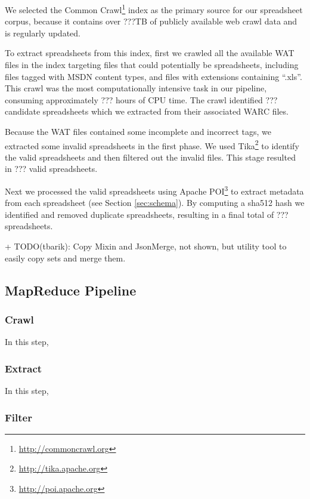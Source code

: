 \documentclass[conference]{IEEEtran}
\begin{document}
We selected the Common Crawl\footnote{\url{http://commoncrawl.org}} index as the primary source for our spreadsheet corpus, because it contains over ???TB of publicly available web crawl data and is regularly updated.

To extract spreadsheets from this index, first we crawled all the available WAT files in the index targeting files that could potentially be spreadsheets, including files tagged with MSDN content types, and files with extensions containing ``.xls''. 
This crawl was the most computationally intensive task in our pipeline, consuming approximately ??? hours of CPU time. 
The crawl identified ??? candidate spreadsheets which we extracted from their associated WARC files. 

Because the WAT files contained some incomplete and incorrect tags, we extracted some invalid spreadsheets in the first phase. We used Tika\footnote{\url{http://tika.apache.org}} to identify the valid spreadsheets and then filtered out the invalid files. This stage resulted in ??? valid spreadsheets.
 
Next we processed the valid spreadsheets using Apache POI\footnote{\url{http://poi.apache.org}} to extract metadata from each spreadsheet (see Section \ref{sec:schema}). By computing a sha512 hash we identified and removed duplicate spreadsheets, resulting in a final total of ??? spreadsheets. 

+ TODO(tbarik): Copy Mixin and JsonMerge, not shown, but utility tool to easily copy sets and merge them.

\subsection{MapReduce Pipeline}

\subsubsection{Crawl} 

In this step, 

\subsubsection{Extract} 

In this step,

\subsubsection{Filter} 
\end{document}
